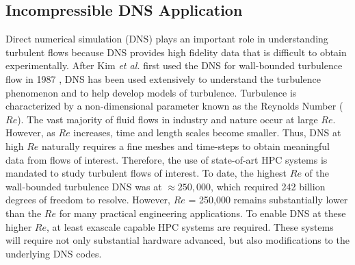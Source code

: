 \subsection{Incompressible DNS Application}
\label{sec:dns_full}

Direct numerical simulation (DNS) plays an important role in
understanding turbulent flows because DNS provides high fidelity data
that is difficult to obtain experimentally. After Kim {\it et al.}
first used the DNS for wall-bounded turbulence flow in 1987
\cite{Kim:1987ub}, DNS has been used extensively to understand the
turbulence phenomenon and to help develop models of turbulence.
Turbulence is characterized by a non-dimensional parameter known
as the Reynolds Number ($Re$).  The vast majority of fluid flows
in industry and nature occur at large $Re$.
However, as $Re$ increases, time and length scales become smaller.
Thus, DNS at high $Re$ naturally requires a fine meshes and time-steps
to obtain meaningful data from flows of interest.
Therefore, the use of state-of-art HPC systems is mandated
 to study turbulent flows of interest. To date, the highest
$Re$ of the wall-bounded turbulence DNS was at $\approx 250,000$,
which required 242 billion degrees of freedom to
resolve\cite{Lee:2015er}. However, $Re$ = 250,000 remains substantially
lower than the $Re$  for many practical engineering applications.
To enable DNS at these higher $Re$, at least exascale
capable HPC systems are required. These systems will require
not only substantial hardware advanced, but also modifications
to the underlying DNS codes.

